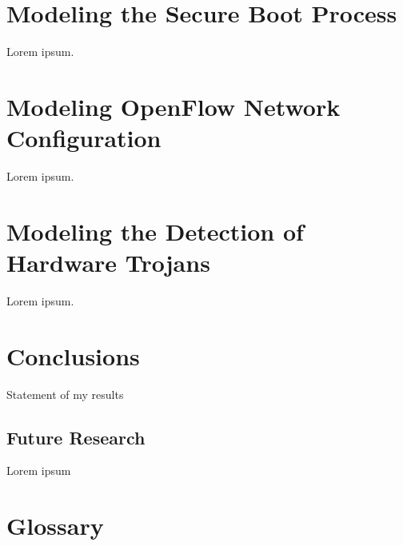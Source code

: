 \documentclass[11pt]{../uhthesis}
\begin{document}
\chapter{Modeling the Secure Boot Process}

Lorem ipsum.


\chapter{Modeling OpenFlow Network Configuration}

Lorem ipsum.


\chapter{Modeling the Detection of Hardware Trojans}

Lorem ipsum.


\chapter{Conclusions}

Statement of my results

\section{Future Research}

Lorem ipsum






\appendix

\chapter{Glossary}
\end{document}
